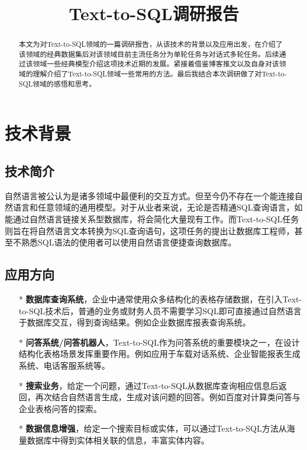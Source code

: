 \documentclass[lang=cn,a4paper,newtx]{elegantpaper}
\title{Text-to-SQL调研报告}
\date{\zhdate{2023/2/2}}
\begin{document}
\maketitle

\begin{abstract}
本文为对Text-to-SQL领域的一篇调研报告，从该技术的背景以及应用出发，在介绍了该领域的经典数据集后对该领域目前主流任务分为单轮任务与对话式多轮任务。后续通过该领域一些经典模型介绍这项技术近期的发展。紧接着借鉴博客推文以及自身对该领域的理解介绍了Text-to-SQL领域一些常用的方法。最后我结合本次调研做了对Text-to-SQL领域的感悟和思考。
\end{abstract}

\section{技术背景}
    \subsection{技术简介}
        自然语言被公认为是诸多领域中最便利的交互方式。但至今仍不存在一个能连接自然语言和任意领域的通用模型。对于从业者来说，无论是否精通SQL查询语言，如能通过自然语言链接关系型数据库，将会简化大量现有工作。而Text-to-SQL任务则旨在将自然语言文本转换为SQL查询语句，这项任务的提出让数据库工程师，甚至不熟悉SQL语法的使用者可以使用自然语言便捷查询数据库。
    
    \subsection{应用方向}
    \begin{enumerate}
        \item[*] \textbf{数据库查询系统}，企业中通常使用众多结构化的表格存储数据，在引入Text-to-SQL技术后，普通的业务或财务人员不需要学习SQL即可直接通过自然语言于数据库交互，得到查询结果。例如企业数据库报表查询系统。
        \item[*]  \textbf{问答系统/问答机器人}，Text-to-SQL作为问答系统的重要模块之一，在设计结构化表格场景发挥重要作用。例如应用于车载对话系统、企业智能报表生成系统、电话客服系统等。
        \item[*]  \textbf{搜索业务}，给定一个问题，通过Text-to-SQL从数据库查询相应信息后返回，再次结合自然语言生成，生成对该问题的回答。例如百度对计算类问答与企业表格问答的探索。
        \item[*]  \textbf{数据信息增强}，给定一个搜索目标或实体，可以通过Text-to-SQL方法从海量数据库中得到实体相关联的信息，丰富实体内容。
    \end{enumerate}
\end{document}
